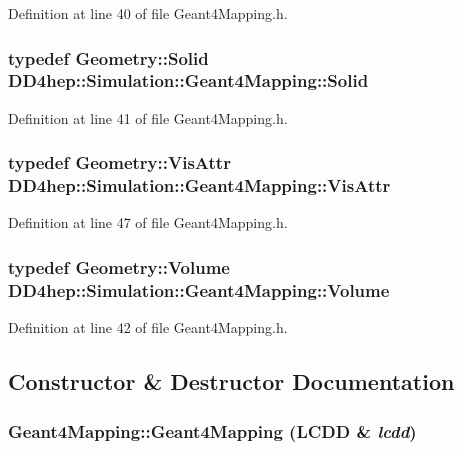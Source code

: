 Definition at line 40 of file Geant4Mapping.h.\hypertarget{class_d_d4hep_1_1_simulation_1_1_geant4_mapping_ac94b8af2661de6ba577901ae8cdea3f9}{
\subsubsection[{Solid}]{\setlength{\rightskip}{0pt plus 5cm}typedef {\bf Geometry::Solid} {\bf DD4hep::Simulation::Geant4Mapping::Solid}}}
\label{class_d_d4hep_1_1_simulation_1_1_geant4_mapping_ac94b8af2661de6ba577901ae8cdea3f9}


Definition at line 41 of file Geant4Mapping.h.\hypertarget{class_d_d4hep_1_1_simulation_1_1_geant4_mapping_aea00056d988cf94eb39b25514928e3a6}{
\subsubsection[{VisAttr}]{\setlength{\rightskip}{0pt plus 5cm}typedef {\bf Geometry::VisAttr} {\bf DD4hep::Simulation::Geant4Mapping::VisAttr}}}
\label{class_d_d4hep_1_1_simulation_1_1_geant4_mapping_aea00056d988cf94eb39b25514928e3a6}


Definition at line 47 of file Geant4Mapping.h.\hypertarget{class_d_d4hep_1_1_simulation_1_1_geant4_mapping_a86c52918ea76c0cbd7a4bffb971f33a5}{
\subsubsection[{Volume}]{\setlength{\rightskip}{0pt plus 5cm}typedef {\bf Geometry::Volume} {\bf DD4hep::Simulation::Geant4Mapping::Volume}}}
\label{class_d_d4hep_1_1_simulation_1_1_geant4_mapping_a86c52918ea76c0cbd7a4bffb971f33a5}


Definition at line 42 of file Geant4Mapping.h.

\subsection{Constructor \& Destructor Documentation}
\hypertarget{class_d_d4hep_1_1_simulation_1_1_geant4_mapping_a60aefec5f9d5816368c7e3db4065b546}{
\subsubsection[{Geant4Mapping}]{\setlength{\rightskip}{0pt plus 5cm}Geant4Mapping::Geant4Mapping ({\bf LCDD} \& {\em lcdd})}}
\label{class_d_d4hep_1_1_simulation_1_1_geant4_mapping_a60aefec5f9d5816368c7e3db4065b546}



